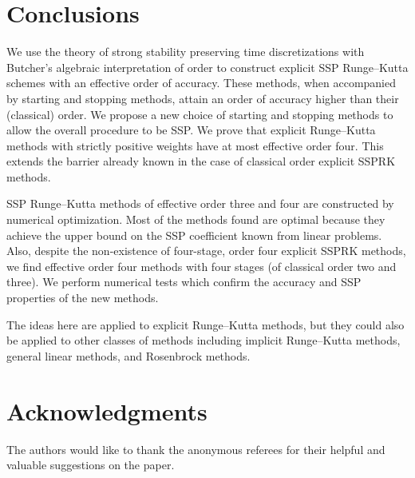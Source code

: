 \documentclass{siamltex}  %
\begin{document}
\section{Conclusions}\label{sec:Conclusion}
We use the theory of strong stability preserving time discretizations
with Butcher's algebraic interpretation of order to construct
explicit SSP Runge--Kutta schemes with an effective order of accuracy.
These methods, when accompanied by starting and stopping
methods, attain an order of accuracy higher than their (classical) order.
We propose a new choice of starting and stopping methods to allow the
overall procedure to be SSP.
We prove that explicit Runge--Kutta methods with strictly positive 
weights have at most effective order four. 
This extends the barrier already known in the case of classical order
explicit SSPRK methods.

SSP Runge--Kutta methods of effective order three and four
are constructed by numerical optimization.
Most of the methods found are optimal because they achieve
the upper bound on the SSP coefficient known from linear
problems.
Also, despite the non-existence of four-stage, order four explicit SSPRK methods, 
we find effective order four methods with four stages (of classical 
order two and three). 
We perform numerical tests which confirm the accuracy and
SSP properties of the new methods.

The ideas here are applied to explicit Runge--Kutta methods, but they
could also be applied to other classes of methods including implicit
Runge--Kutta methods, general linear methods, and Rosenbrock methods.


\section*{Acknowledgments}{%
	The authors would like to thank the anonymous referees for their helpful and valuable 
	suggestions on the paper.
	\vspace*{20pt}
}%



		
\end{document}
